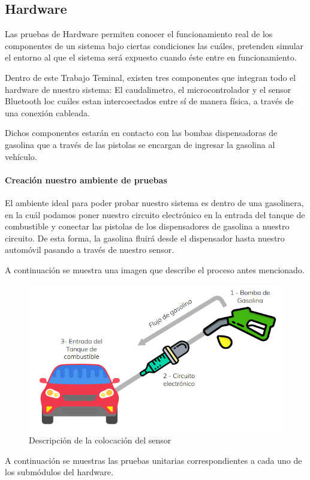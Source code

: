 \subsection{Hardware}

Las pruebas de Hardware permiten conocer el funcionamiento real de los componentes de un sistema bajo ciertas condiciones las cuáles, pretenden simular el entorno al que el sistema será expuesto cuando éste entre en funcionamiento.

Dentro de este Trabajo Teminal, existen tres componentes que integran todo el hardware de nuestro sistema: El caudalimetro, el microcontrolador y el sensor Bluetooth loc cuáles estan intercoectados entre sí de manera física, a través de una conexión cableada.

Dichos componentes estarán en contacto con las bombas dispensadoras de gasolina que a través de las pistolas se encargan de ingresar la gasolina al vehículo. 

\paragraph{Creación nuestro ambiente de pruebas}
El ambiente ideal para poder probar nuestro sistema es dentro de una gasolinera, en la cuál podamos poner nuestro circuito electrónico en la entrada del tanque de combustible y conectar las pistolas de los dispensadores de gasolina a nuestro circuito.
De esta forma, la gasolina fluirá desde el dispensador hasta nuestro automóvil pasando a través de nuestro sensor.

A continuación se muestra una imagen que describe el proceso antes mencionado.

\begin{figure}[H]
	\centering
	\includegraphics[scale=.60]{Capitulo6/images/flujo_uno}
	\caption{Descripción de la colocación del sensor}
	\label{fig:flujo_uno}
\end{figure}

A continuación se muestras las pruebas unitarias correspondientes a cada uno de los submódulos del hardware.


